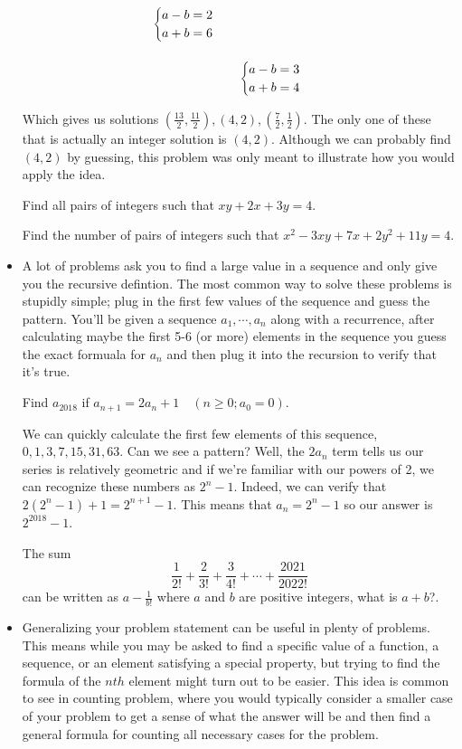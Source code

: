 \documentclass[11pt]{article}
\begin{document}
\begin{itemize}
\[\begin{array}{rrr}
    \begin{cases}
        a-b=2 \\
        a+b=6 \\
    \end{cases}  \vspace{0.5cm}\\
    & 
    \begin{cases}
    a-b=3 \\ 
    a+b=4 \\
    \end{cases}
    &
 \end{array}
 \]

Which gives us solutions $(\frac{13}{2}, \frac{11}{2}), (4, 2), (\frac{7}{2}, \frac{1}{2})$. The only one of these that is actually an integer solution is $(4, 2)$. Although we can probably find $(4, 2)$ by guessing, this problem was only meant to illustrate how you would apply the idea.
    \begin{exercise}
    Find all pairs of integers such that $xy+2x+3y=4$.
    \end{exercise}
    \begin{exercise}
    Find the number of pairs of integers such that $x^2-3xy+7x+2y^2+11y=4$.
    \end{exercise}
\item A lot of problems ask you to find a large value in a sequence and only give you the recursive defintion. The most common way to solve these problems is stupidly simple; plug in the first few values of the sequence and guess the pattern. You'll be given a sequence $a_1, \cdots, a_n$ along with a recurrence, after calculating maybe the first 5-6 (or more) elements in the sequence you guess the 
 exact formuala for $a_n$ and then plug it into the recursion to verify that it's true. 
 \begin{example}
    Find $a_{2018}$ if $a_{n+1} = 2a_{n} + 1 \quad (n \geq 0; a_0 = 0)$.
 \end{example}
 We can quickly calculate the first few elements of this sequence, $0, 1, 3, 7, 15, 31, 63$. Can we see a pattern? Well, the $2 a_n$ term tells us our series is relatively geometric and if we're familiar with our powers of 2, we can recognize these numbers as $2^n-1$. Indeed, we can verify that $2(2^n -1) + 1 = 2^{n+1} - 1$. This means that $a_n = 2^n - 1$ so our answer is $2^{2018} - 1$.
\begin{exercise}
The sum
\[
\frac{1}{2!} + \frac{2}{3!} + \frac{3}{4!} + \cdots + \frac{2021}{2022!}
\]
can be written as $a-\frac{1}{b!}$ where $a$ and $b$ are positive integers, what is $a+b$?.
\end{exercise}
 \item Generalizing your problem statement can be useful in plenty of problems. This means while you may be asked to find a specific value of a function, a sequence, or an element satisfying a special property, but trying to find the formula of the $nth$ element might turn out to be easier. This idea is common to see in counting problem, where you would typically consider a smaller case of your problem to get a sense of what the answer
    will be and then find a general formula for counting all necessary cases for the problem.



\end{itemize}
\end{document}
